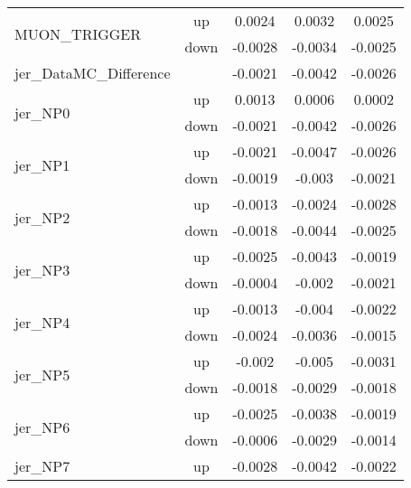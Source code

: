\begin{table}[h!]
\begin{tabular}{lcccc}
\multirow{2}{*}{MUON\_TRIGGER}      & up   &     0.0024     &     0.0032     &     0.0025      \\
                                       & down &     -0.0028     &     -0.0034     &     -0.0025       \\ \hline
\multirow{2}{*}{jer\_DataMC\_Difference}  &  & \multirow{2}{*}{-0.0021} & \multirow{2}{*}{-0.0042}  & \multirow{2}{*}{-0.0026}  \\  \\ \hline
\multirow{2}{*}{jer\_NP0}      & up   &     0.0013     &     0.0006     &     0.0002      \\
                                       & down &     -0.0021     &     -0.0042     &     -0.0026       \\ \hline
\multirow{2}{*}{jer\_NP1}      & up   &     -0.0021     &     -0.0047     &     -0.0026      \\
                                       & down &     -0.0019     &     -0.003     &     -0.0021       \\ \hline
\multirow{2}{*}{jer\_NP2}      & up   &     -0.0013     &     -0.0024     &     -0.0028      \\
                                       & down &     -0.0018     &     -0.0044     &     -0.0025       \\ \hline
\multirow{2}{*}{jer\_NP3}      & up   &     -0.0025     &     -0.0043     &     -0.0019      \\
                                       & down &     -0.0004     &     -0.002     &     -0.0021       \\ \hline
\multirow{2}{*}{jer\_NP4}      & up   &     -0.0013     &     -0.004     &     -0.0022      \\
                                       & down &     -0.0024     &     -0.0036     &     -0.0015       \\ \hline
\multirow{2}{*}{jer\_NP5}      & up   &     -0.002     &     -0.005     &     -0.0031      \\
                                       & down &     -0.0018     &     -0.0029     &     -0.0018       \\ \hline
\multirow{2}{*}{jer\_NP6}      & up   &     -0.0025     &     -0.0038     &     -0.0019      \\
                                       & down &     -0.0006     &     -0.0029     &     -0.0014       \\ \hline
\multirow{2}{*}{jer\_NP7}      & up   &     -0.0028     &     -0.0042     &     -0.0022      \\

\end{tabular}
\end{table}
